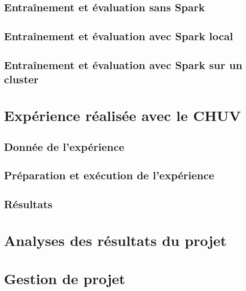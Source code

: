 \documentclass[a4paper,10pt,openany,oneside]{sphinxmanual}
\begin{document}
\section{Entraînement et évaluation sans Spark}
\label{index:entrainement-et-evaluation-sans-spark}

\section{Entraînement et évaluation avec Spark local}
\label{index:entrainement-et-evaluation-avec-spark-local}

\section{Entraînement et évaluation avec Spark sur un cluster}
\label{index:entrainement-et-evaluation-avec-spark-sur-un-cluster}

\chapter{Expérience réalisée avec le CHUV}
\label{index:experience-realisee-avec-le-chuv}

\section{Donnée de l'expérience}
\label{index:donnee-de-l-experience}

\section{Préparation et exécution de l'expérience}
\label{index:preparation-et-execution-de-l-experience}

\section{Résultats}
\label{index:resultats}

\chapter{Analyses des résultats du projet}
\label{index:analyses-des-resultats-du-projet}

\chapter{Gestion de projet}
\label{index:gestion-de-projet}
\end{document}
